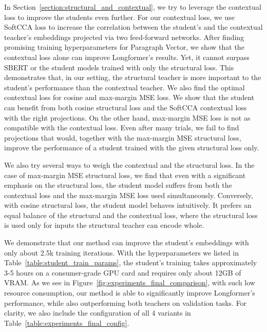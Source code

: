 In Section~\ref{section:structural_and_contextual}, we try to leverage the
contextual loss to improve the students even further. For our contextual loss,
we use SoftCCA loss to increase the correlation between the student's and the
contextual teacher's embeddings projected via two feed-forward networks. After
finding promising training hyperparameters for Paragraph Vector, we show that
the contextual loss alone can improve Longformer's results. Yet, it cannot
surpass SBERT or the student models trained with only the structural loss. This
demonstrates that, in our setting, the structural teacher is more important to
the student's performance than the contextual teacher. We also find the optimal
contextual loss for cosine and max-margin MSE loss. We show that the student
can benefit from both cosine structural loss and the SoftCCA contextual loss with the right projections. On the other hand, max-margin MSE loss is not as
compatible with the contextual loss. Even after many trials, we fail to find
projections that would, together with the max-margin MSE structural loss,
improve the performance of a student trained with the given structural loss
only.

We also try several ways to weigh the contextual and the structural loss. In the case of max-margin MSE structural loss, we find that even with a significant emphasis on the structural loss, the student model suffers from both the contextual loss and the max-margin MSE loss used simultaneously. Conversely, with cosine structural loss, the student model behaves intuitively. It
prefers an equal balance of the structural and the contextual loss, where the
structural loss is used only for inputs the structural teacher can encode
whole.

We demonstrate that our method can improve the student's embeddings with only about 2.5k training iterations. With the hyperparameters we listed in Table~\ref{table:student_train_params}, the student's training takes approximately 3-5 hours on a consumer-grade GPU card and requires only about 12GB of VRAM. As we see in Figure~\ref{fig:experiments_final_comparison}, with such low resource consumption, our method is able to significantly improve Longformer's performance, while also outperforming both teachers on validation tasks. For clarity, we also include the configuration of all 4 variants in
Table~\ref{table:experiments_final_config}.

